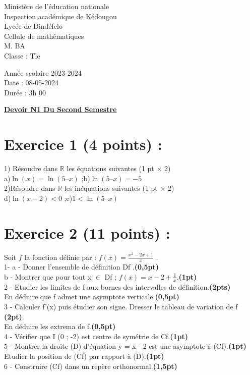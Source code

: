 \documentclass{article}
\begin{document}
\begin{minipage}{0.5\textwidth}
	Ministère de l'éducation nationale  \\
	Inspection académique de Kédougou   \\
	Lycée de Dindéfelo            \\
	Cellule de mathématiques            \\
	M. BA                          \\
	Classe : Tle  \\
\end{minipage}
\begin{minipage}{0.5\textwidth}
	Année scolaire 2023-2024 \\
	Date : 08-05-2024 \\
	Durée : 3h 00 \\
\end{minipage}

\begin{center}
	\textbf{{\underline{Devoir N1 Du Second Semestre}}}
\end{center}

\section*{Exercice 1 (4 points) :}
1) Résoudre dans $\mathbb{R}$ les équations suivantes  (1 pt $\times$ 2)\\
a)$\ln(x) = \ln(5 –x)$ ;\quad\quad  b)$\ln(5 –x)=-5$ \\
2)Résoudre dans $\mathbb{R}$ les inéquations suivantes (1 pt $\times$ 2)\\
d)$\ln(x-2)<0$ ;\quad\quad e)$1<\ln(5 –x)$
\section*{Exercice 2 (11 points) :}
Soit  $f$  la fonction définie par : $f(x) =\frac{x^{2}-2x+1}{x}$ .\\
    1- a - Donner  l’ensemble de définition  Df .\textbf{(0,5pt)}\\
b - Montrer que pour tout x $\in$ Df ; $f(x) =x-2+\frac{1}{x} $.\textbf{(1pt)}\\
       2  - Etudier les limites de f aux bornes des intervalles de définition.\textbf{(2pts)}\\ 
              En déduire que f admet une asymptote verticale.\textbf{(0,5pt)}\\
       3 - Calculer  f'(x) puis étudier son signe. Dresser le tableau de variation de f \textbf{(2pt)}.\\
             En déduire les extrema  de f.\textbf{(0,5pt)}\\
        4 - Vérifier que  I (0 ; -2) est centre de symétrie de Cf.\textbf{(1pt)} \\
        5 -  Montrer la droite (D) d’équation  y = x - 2  est une asymptote à (Cf).\textbf{(1pt)} \\
             Etudier la position de (Cf) par rapport à (D).\textbf{(1pt)}\\
         6 - Construire (Cf) dans un repère orthonormal.\textbf{(1,5pt)}\\
\end{document}
